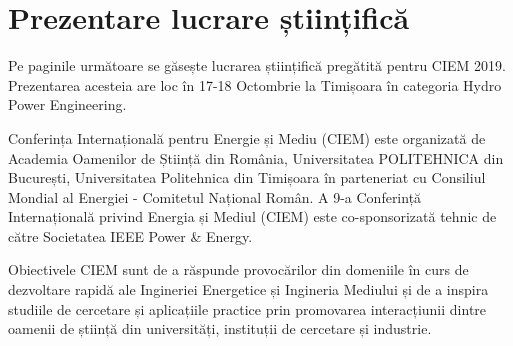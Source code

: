

\clearpage


\section{Prezentare lucrare științifică}

Pe paginile următoare se găsește lucrarea științifică pregătită pentru CIEM 2019. Prezentarea acesteia are loc în 17-18 Octombrie la Timișoara în categoria Hydro Power Engineering.

Conferința Internațională pentru Energie și Mediu (CIEM) este organizată de Academia Oamenilor de Știință din România, Universitatea POLITEHNICA din București, Universitatea Politehnica din Timișoara în parteneriat cu Consiliul Mondial al Energiei - Comitetul Național Român. A 9-a Conferință Internațională privind Energia și Mediul (CIEM) este co-sponsorizată tehnic de către Societatea IEEE Power & Energy.

Obiectivele CIEM sunt de a răspunde provocărilor din domeniile în curs de dezvoltare rapidă ale Ingineriei Energetice și Ingineria Mediului și de a inspira studiile de cercetare și aplicațiile practice prin promovarea interacțiunii dintre oamenii de știință din universități, instituții de cercetare și industrie.



\clearpage